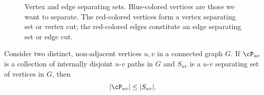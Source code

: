 \begin{figure}[!htbp]
\centering
{}
\qquad
{}
\qquad
{}
\caption{Vertex and edge separating sets. Blue-colored vertices are
  those we want to separate. The red-colored vertices form a vertex
  separating set or vertex cut; the red-colored
  edges constitute an edge separating set or edge cut.}
\label{fig:distance_connectivity:vertex_edge_separating_sets}
\end{figure}

\begin{proposition}
\label{prop:distance_connectivity:upper_bound_internally_disjoint_paths}
Consider two distinct, non-adjacent vertices $u,v$ in a connected
graph $G$. If $\cP_{uv}$ is a collection of internally disjoint
$u$-$v$ paths in $G$ and $S_{uv}$ is a $u$-$v$ separating set of
vertices in $G$, then
\begin{equation}
\label{eqn:distance_connectivity:upper_bound_internally_disjoint_paths}
|\cP_{uv}| \leq |S_{uv}|.
\end{equation}
\end{proposition}

